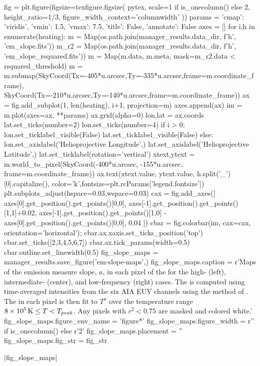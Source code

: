\begin{pycode}
fig = plt.figure(figsize=texfigure.figsize(
    pytex,
    scale=1 if is_onecolumn() else 2,
    height_ratio=1/3,
    figure_width_context='columnwidth'
))
params = {'cmap': 'viridis', 'vmin': 1.5, 'vmax': 7.5, 'title': False, 'annotate': False}
axes = []
for i,h in enumerate(heating):
    m = Map(os.path.join(manager_results.data_dir, f'{h}', 'em_slope.fits'))
    m_r2 = Map(os.path.join(manager_results.data_dir, f'{h}', 'em_slope_rsquared.fits'))
    m = Map(m.data, m.meta, mask=m_r2.data < rsquared_threshold)
    m = m.submap(SkyCoord(Tx=-405*u.arcsec,Ty=-335*u.arcsec,frame=m.coordinate_frame),
                 SkyCoord(Tx=-210*u.arcsec,Ty=-140*u.arcsec,frame=m.coordinate_frame))
    ax = fig.add_subplot(1, len(heating), i+1, projection=m)
    axes.append(ax)
    im = m.plot(axes=ax, **params)
    ax.grid(alpha=0)
    lon,lat = ax.coords
    lat.set_ticks(number=2)
    lon.set_ticks(number=4)
    if i > 0:
        lon.set_ticklabel_visible(False)
        lat.set_ticklabel_visible(False)
    else:
        lon.set_axislabel('Helioprojective Longitude',)
        lat.set_axislabel('Helioprojective Latitude',)
        lat.set_ticklabel(rotation='vertical')
    xtext,ytext = m.world_to_pixel(SkyCoord(-400*u.arcsec, -155*u.arcsec, frame=m.coordinate_frame))
    ax.text(xtext.value, ytext.value, h.split('_')[0].capitalize(),
            color='k',fontsize=plt.rcParams['legend.fontsize'])
plt.subplots_adjust(hspace=0.03,wspace=0.03)
cax = fig.add_axes([
    axes[0].get_position().get_points()[0,0],
    axes[-1].get_position().get_points()[1,1]+0.02,
    axes[-1].get_position().get_points()[1,0] - axes[0].get_position().get_points()[0,0],
    0.04
])
cbar = fig.colorbar(im, cax=cax, orientation='horizontal');
cbar.ax.xaxis.set_ticks_position('top')
cbar.set_ticks([2,3,4,5,6,7])
cbar.ax.tick_params(width=0.5)
cbar.outline.set_linewidth(0.5)
fig_slope_maps = manager_results.save_figure('em-slope-maps',)
fig_slope_maps.caption = r'Maps of the emission measure slope, $a$, in each pixel of the \AR{} for the high- (left), intermediate- (center), and low-frequency (right) cases. The \dem{} is computed using time-averaged intensities from the six AIA EUV channels using the method of \citet{hannah_differential_2012}. The \dem{} in each pixel is then fit to $T^a$ over the temperature range $8\times10^{5}\,\textup{K}\le T< T_{peak}$. Any pixels with $r^2<0.75$ are masked and colored white.'
fig_slope_maps.figure_env_name = 'figure*'
fig_slope_maps.figure_width = r'\columnwidth' if is_onecolumn() else r'2\columnwidth'
fig_slope_maps.placement = ''
fig_slope_maps.fig_str = fig_str
\end{pycode}
|fig_slope_maps|

